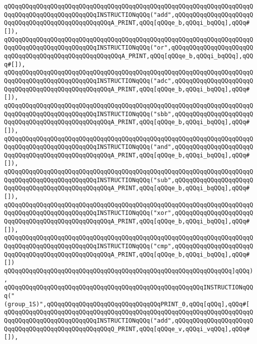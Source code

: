 \newline
\verb|qQQqqQQqqQQqqQQqqQQqqQQqqQQqqQQqqQQqqQQqqQQqqQQqqQQqqQQqqQQqqQQqqQQqqQQqqQQqqQQqqQQqqQQqqQQqqQQqINSTRUCTIONqQQq("add",qQQqqQQqqQQqqQQqqQQqqQQqqQQqqQQqqQQqqQQqqQQqqQQqqQQqA_PRINT,qQQq[qQQqe_b,qQQqi_bqQQq],qQQq#[]),|\newline
\verb|qQQqqQQqqQQqqQQqqQQqqQQqqQQqqQQqqQQqqQQqqQQqqQQqqQQqqQQqqQQqqQQqqQQqqQQqqQQqqQQqqQQqqQQqqQQqqQQqINSTRUCTIONqQQq("or",qQQqqQQqqQQqqQQqqQQqqQQqqQQqqQQqqQQqqQQqqQQqqQQqqQQqqQQqA_PRINT,qQQq[qQQqe_b,qQQqi_bqQQq],qQQq#[]),|\newline
\verb|qQQqqQQqqQQqqQQqqQQqqQQqqQQqqQQqqQQqqQQqqQQqqQQqqQQqqQQqqQQqqQQqqQQqqQQqqQQqqQQqqQQqqQQqqQQqqQQqINSTRUCTIONqQQq("adc",qQQqqQQqqQQqqQQqqQQqqQQqqQQqqQQqqQQqqQQqqQQqqQQqqQQqA_PRINT,qQQq[qQQqe_b,qQQqi_bqQQq],qQQq#[]),|\newline
\verb|qQQqqQQqqQQqqQQqqQQqqQQqqQQqqQQqqQQqqQQqqQQqqQQqqQQqqQQqqQQqqQQqqQQqqQQqqQQqqQQqqQQqqQQqqQQqqQQqINSTRUCTIONqQQq("sbb",qQQqqQQqqQQqqQQqqQQqqQQqqQQqqQQqqQQqqQQqqQQqqQQqqQQqA_PRINT,qQQq[qQQqe_b,qQQqi_bqQQq],qQQq#[]),|\newline
\verb|qQQqqQQqqQQqqQQqqQQqqQQqqQQqqQQqqQQqqQQqqQQqqQQqqQQqqQQqqQQqqQQqqQQqqQQqqQQqqQQqqQQqqQQqqQQqqQQqINSTRUCTIONqQQq("and",qQQqqQQqqQQqqQQqqQQqqQQqqQQqqQQqqQQqqQQqqQQqqQQqqQQqA_PRINT,qQQq[qQQqe_b,qQQqi_bqQQq],qQQq#[]),|\newline
\verb|qQQqqQQqqQQqqQQqqQQqqQQqqQQqqQQqqQQqqQQqqQQqqQQqqQQqqQQqqQQqqQQqqQQqqQQqqQQqqQQqqQQqqQQqqQQqqQQqINSTRUCTIONqQQq("sub",qQQqqQQqqQQqqQQqqQQqqQQqqQQqqQQqqQQqqQQqqQQqqQQqqQQqA_PRINT,qQQq[qQQqe_b,qQQqi_bqQQq],qQQq#[]),|\newline
\verb|qQQqqQQqqQQqqQQqqQQqqQQqqQQqqQQqqQQqqQQqqQQqqQQqqQQqqQQqqQQqqQQqqQQqqQQqqQQqqQQqqQQqqQQqqQQqqQQqINSTRUCTIONqQQq("xor",qQQqqQQqqQQqqQQqqQQqqQQqqQQqqQQqqQQqqQQqqQQqqQQqqQQqA_PRINT,qQQq[qQQqe_b,qQQqi_bqQQq],qQQq#[]),|\newline
\verb|qQQqqQQqqQQqqQQqqQQqqQQqqQQqqQQqqQQqqQQqqQQqqQQqqQQqqQQqqQQqqQQqqQQqqQQqqQQqqQQqqQQqqQQqqQQqqQQqINSTRUCTIONqQQq("cmp",qQQqqQQqqQQqqQQqqQQqqQQqqQQqqQQqqQQqqQQqqQQqqQQqqQQqA_PRINT,qQQq[qQQqe_b,qQQqi_bqQQq],qQQq#[])|\newline
\newline
\verb|qQQqqQQqqQQqqQQqqQQqqQQqqQQqqQQqqQQqqQQqqQQqqQQqqQQqqQQqqQQqqQQq]qQQq),|\newline
\verb|qQQqqQQqqQQqqQQqqQQqqQQqqQQqqQQqqQQqqQQqqQQqqQQqqQQqqQQqINSTRUCTIONqQQq("(group_1S)",qQQqqQQqqQQqqQQqqQQqqQQqqQQqqQQqPRINT_0,qQQq[qQQq],qQQq#[|\newline
\verb|qQQqqQQqqQQqqQQqqQQqqQQqqQQqqQQqqQQqqQQqqQQqqQQqqQQqqQQqqQQqqQQqqQQqqQQqqQQqqQQqqQQqqQQqqQQqqQQqINSTRUCTIONqQQq("add",qQQqqQQqqQQqqQQqqQQqqQQqqQQqqQQqqQQqqQQqqQQqqQQqqQQqQ_PRINT,qQQq[qQQqe_v,qQQqi_vqQQq],qQQq#[]),|\newline
